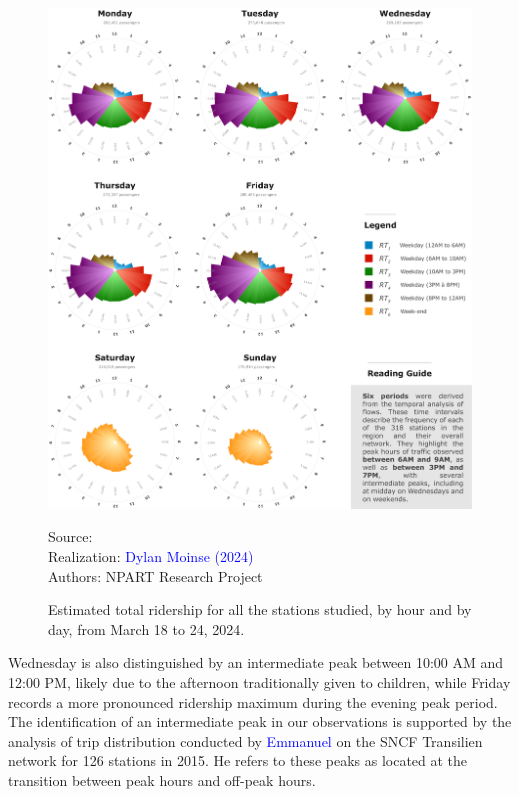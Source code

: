 \begin{refsegment}
\begin{figure}[h!]\vspace*{4pt}
    \caption{Estimated total ridership for all the stations studied, by hour and by day, from March 18 to 24, 2024.}
    \label{fig-chap6:resultats-frequentation-periode}
    \centerline{\includegraphics[width=1\columnwidth]{src/Figures/Chap-6/EN_NPART_Flux_frequentation.pdf}}
    \vspace{5pt}
    \begin{flushright}\scriptsize{
    Source: \textcolor{blue}{\textcite{google_maps_google_2024}}
    \\
    Realization: \textcolor{blue}{Dylan Moinse (2024)}
    \\
    Authors: \acrshort{NPART} Research Project
    }\end{flushright}
\end{figure}

Wednesday is also distinguished by an intermediate peak between 10:00 AM and 12:00 PM, likely due to the afternoon traditionally given to children, while Friday records a more pronounced ridership maximum during the evening peak period. The identification of an intermediate peak in our observations is supported by the analysis of trip distribution conducted by \textcolor{blue}{Emmanuel} \textcolor{blue}{\textcite[66]{munch_periodes_2017}} on the SNCF Transilien network for 126 stations in 2015. He refers to these peaks as  located at the transition between peak hours and off-peak hours.


\end{refsegment}
